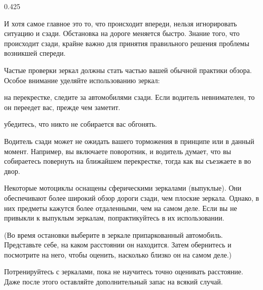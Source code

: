 \begin{langblock}{0.425}
\begin{rus}
		И хотя самое главное это то, что происходит впереди, нельзя игнорировать ситуацию и сзади. Обстановка на дороге меняется быстро. Знание того, что происходит сзади, крайне важно для принятия правильного решения проблемы возникшей спереди.
		
		Частые проверки зеркал должны стать частью вашей обычной практики обзора. Особое внимание уделяйте использованию зеркал:
		
		\begin{description} [noitemsep]
			\item [Когда вы остановились] на перекрестке, следите за автомобилями сзади. Если водитель невнимателен, то он переедет вас, прежде чем заметит.
			\item [Перед сменой полосы] убедитесь, что никто не собирается вас обгонять.
			\item [Перед тем как снизить скорость.] Водитель сзади может не ожидать вашего торможения в принципе или в данный момент. Например, вы включаете поворотник, и водитель думает, что вы собираетесь повернуть на ближайшем перекрестке, тогда как вы съезжаете в во двор.
		\end{description}
		
		Некоторые мотоциклы оснащены сферическими зеркалами (выпуклые). Они обеспечивают более широкий обзор дороги сзади, чем плоские зеркала. Однако, в них предметы кажутся более отдаленными, чем на самом деле. Если вы не привыкли к выпуклым зеркалам, попрактикуйтесь в их использовании.
		
		(Во время остановки выберите в зеркале припаркованный автомобиль. Представьте себе, на каком расстоянии он находится. Затем обернитесь и посмотрите на него, чтобы оценить, насколько близко он на самом деле.)
		
		Потренируйтесь с зеркалами, пока не научитесь точно оценивать расстояние.  Даже после этого оставляйте дополнительный запас на всякий случай.
\end{rus}
\end{langblock}








